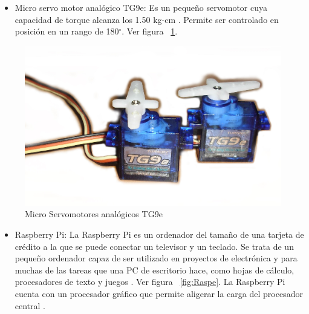 \begin{itemize}
\item Micro servo motor anal\'ogico TG9e: Es un pequeño servomotor cuya capacidad de torque alcanza los 1.50 kg-cm \cite{microservo}. Permite ser controlado en posición en un rango de 180$^{\circ}$. Ver figura ~\ref{fig:Servo}.  

\end{itemize}

\begin{figure}[hbtp]
\centering
\includegraphics[scale=0.09]{imagenes/servosTg9B.jpg}

\caption{Micro Servomotores analógicos TG9e}

\label{fig:Servo}
\end{figure}

\begin{itemize}
\item Raspberry Pi: La Raspberry Pi es un ordenador del tamaño de una tarjeta de crédito a la que se puede conectar un televisor y un teclado. Se trata de un pequeño ordenador capaz de ser utilizado en proyectos de electrónica y para muchas de las tareas que una PC de escritorio hace, como hojas de cálculo, procesadores de texto y juegos \cite{raspberry}. Ver figura ~\ref{fig:Raspe}. La Raspberry Pi cuenta con un procesador gráfico que permite aligerar la carga del procesador central \cite{elLinux}. 

\end{itemize}

